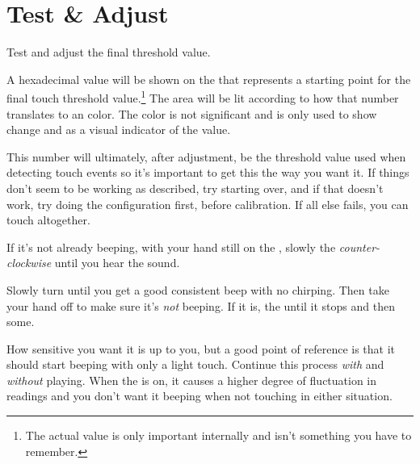 \section{Test \& Adjust} \label{Test and Adjust} 

Test and adjust the final threshold value.

\par\medskip

A hexadecimal value will be shown on the  that represents a starting
point for the final touch threshold value.\footnote{ The actual value is only
important internally and isn't something you have to remember.} The  area
will be lit according to how that number translates to an  color.  The
color is not significant and is only used to show change and as a visual
indicator of the value.

\par\medskip

This number will ultimately, after adjustment, be the threshold value used when
detecting touch events so it's important to get this the way you want it.  If
things don't seem to be working as described, try starting over, and if that
doesn't work, try doing the configuration first, before calibration.  If all
else fails, you can \hyperref[Touch Settings - Disabled]{} touch
altogether.

\par\medskip

If it's not already beeping, with your hand still on the , slowly 
the  \textit{counter-clockwise} until you hear the
\hyperref[Beeper]{} sound.


Slowly turn until you get a good consistent beep with no chirping.  Then take
your hand off to make sure it's \textit{not} beeping.  If it is,  the
  until it stops and then some.


How sensitive you want it is up to you, but a good point of reference is that
it should start beeping with only a light touch.  Continue this process
\textit{with} and \textit{without}  playing.  When the  is on, it
causes a higher degree of fluctuation in readings and you don't want it beeping
when not touching in either situation.

